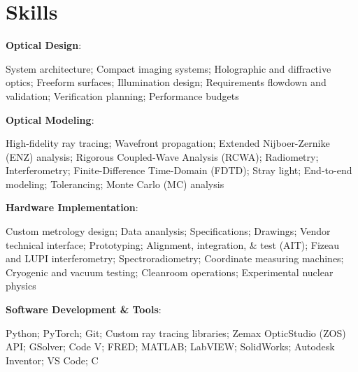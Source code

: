 \documentclass[letterpaper,11pt]{article}
\begin{document}
\section{Skills}
\begin{itemize}[leftmargin=0.15in, label={}]
    \small{
        \item\begin{minipage}[t]{\linewidth}
            \textbf{Optical Design}: \hangindent=25pt  \raggedright System architecture; Compact imaging systems; Holographic and diffractive optics; Freeform surfaces; Illumination design; Requirements flowdown and validation; Verification planning; Performance budgets
        \end{minipage}
        \item\begin{minipage}[t]{\linewidth}
            \textbf{Optical Modeling}: \hangindent=25pt  \raggedright High-fidelity ray tracing; Wavefront propagation; Extended Nijboer-Zernike (ENZ) analysis; Rigorous Coupled-Wave Analysis (RCWA); Radiometry; Interferometry; Finite-Difference Time-Domain (FDTD); Stray light; End-to-end modeling; Tolerancing; Monte Carlo (MC) analysis
        \end{minipage}
        \item\begin{minipage}[t]{\linewidth}
            \textbf{Hardware Implementation}: \hangindent=25pt  \raggedright Custom metrology design; Data ananlysis; Specifications; Drawings; Vendor technical interface; Prototyping; Alignment, integration, \& test (AIT); Fizeau and LUPI interferometry; Spectroradiometry; Coordinate measuring machines; Cryogenic and vacuum testing; Cleanroom operations; Experimental nuclear physics
        \end{minipage}
        \item\begin{minipage}[t]{\linewidth}
            \textbf{Software Development \& Tools}: \hangindent=25pt  \raggedright Python; PyTorch; Git; Custom ray tracing libraries; Zemax OpticStudio (ZOS) API; GSolver; Code V; FRED; MATLAB; LabVIEW; SolidWorks; Autodesk Inventor; VS Code; C
        \end{minipage}
    }
\end{itemize}


\end{document}

